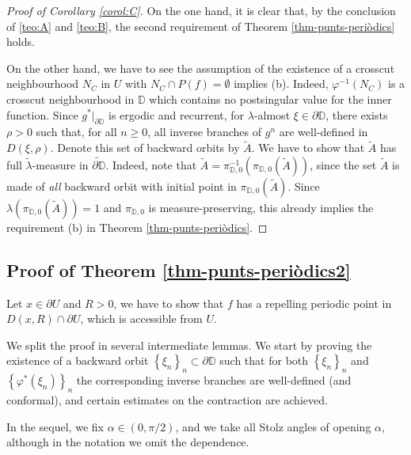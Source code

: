 \documentclass[11pt]{article}
\theoremstyle{definition}
\theoremstyle{remark}
\theoremstyle{plain}
\begin{document}
\begin{proof}[Proof of Corollary \ref{corol:C}]
	On the one hand, it is clear that, by the conclusion of \ref{teo:A} and \ref{teo:B}, the second requirement of Theorem \ref{thm-punts-periòdics} holds.
	
	 On the other hand, we have to see the assumption of the existence of a crosscut neighbourhood $ N_C $ in $ U $ with $ N_C\cap P(f)=\emptyset $ implies (b). Indeed, $ \varphi^{-1}(N_C) $ is a crosscut neighbourhood in $ \mathbb{D} $ which contains no postsingular value for the inner function. Since $ g^*|_{\partial\mathbb{D}} $ is ergodic and recurrent, for $ \lambda $-almost $ \xi\in \partial\mathbb{D} $, there exists $ \rho>0 $ such that, for all $ n\geq 0 $, all inverse branches of $ g^n $ are well-defined in $ D(\xi, \rho) $. Denote this set of backward orbits by $ \widetilde{A} $. We have to show that $ \widetilde{A} $ has full $ \widetilde{\lambda} $-measure in $ \widetilde{\partial\mathbb{D}} $. Indeed, note that
	 $\widetilde{A}=\pi_{\mathbb{D},0}^{-1}(\pi_{\mathbb{D}, 0}(\widetilde{A}))$, since the set $ \widetilde{A} $ is made of {\em all} backward orbit with initial point in $ \pi_{\mathbb{D}, 0}(\widetilde{A})$. Since $ \lambda(\pi_{\mathbb{D}, 0}(\widetilde{A}))=1$
and $ \pi_{\mathbb{D}, 0} $ is measure-preserving,	  this already implies the requirement (b) in Theorem \ref{thm-punts-periòdics}. 
\end{proof}



\subsection{Proof of Theorem \ref{thm-punts-periòdics2}}
Let $ x\in\partial U $ and $ R>0 $, we have to show that $ f $ has a repelling periodic point in $ D(x, R)\cap\partial U $, which is accessible from $ U $. 

We split the proof in several intermediate lemmas. We start by proving the existence of a backward orbit $ \left\lbrace \xi_n\right\rbrace _n \subset \partial\mathbb{D}$ such that for both $ \left\lbrace \xi_n\right\rbrace _n$ and $ \left\lbrace \varphi^*(\xi_n)\right\rbrace _n$ the corresponding inverse branches are well-defined (and conformal), and certain estimates on the contraction are achieved.

In the sequel, we fix $ \alpha\in (0, \pi/2) $, and we take all Stolz angles of opening $  \alpha$, although in the notation we omit the dependence.
\end{document}
